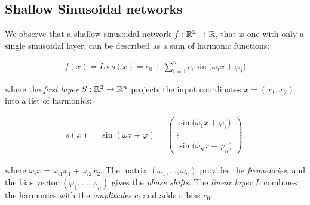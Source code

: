 


\subsection{Shallow Sinusoidal networks}

We observe that a shallow sinusoidal network $f:\mathbb{R}^2\to \mathbb{R}$, that is one with only a single sinusoidal layer, can be described as a sum of harmonic functions:

\begin{align}\label{e-fourier_series}
    f(x) = L\circ s(x) =  c_0 + \sum_{i=1}^{n} c_i  \sin\Big(\dot{\omega_i}{ x}+ \varphi_i\Big)
\end{align}

where the \textit{first layer} $S:\mathbb{R}^2\to \mathbb{R}^{n}$ projects the input coordinates $x=(x_1,x_2)$ into a list of harmonics:

\begin{align}\label{e-firstlayer}
\displaystyle
    s(x)=\sin(\omega x +\varphi)=
    \left(
    \begin{array}{c}
        \sin\big(\dot{\omega_1}{x}+\varphi_1\big)\\
         {\vdots}\\
         \sin\big(\dot{\omega_{n}}{x}+\varphi_{n}\big)
    \end{array}
    \right).
\end{align}

where $\dot{\omega_i}{x}=\omega_{i1}x_1+\omega_{i2}x_2$. The matrix $(\omega_1, \ldots, \omega_{n})$ provides the \textit{frequencies}, and the bias vector $(\varphi_1, \ldots, \varphi_{n})$ gives the \textit{phase shifts}. The \textit{linear layer} $L$ combines the harmonics with the \textit{amplitudes} $c_i$ and adds a bias $c_0$.

